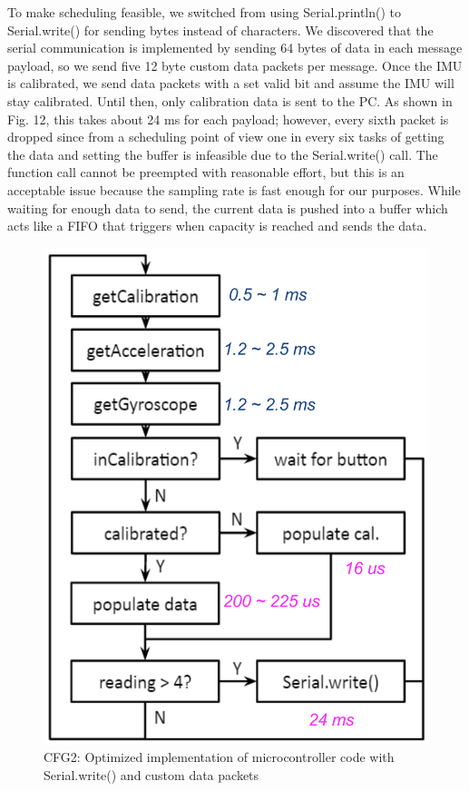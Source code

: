 \documentclass[10pt,journal]{IEEEtran}
\begin{document}
\par To make scheduling feasible, we switched from using Serial.println() to Serial.write() for sending bytes instead of characters. We discovered that the serial communication is implemented by sending 64 bytes of data in each message payload, so we send five 12 byte custom data packets per message. Once the IMU is calibrated, we send data packets with a set valid bit and assume the IMU will stay calibrated. Until then, only calibration data is sent to the PC. As shown in Fig. 12, this takes about 24 ms for each payload; however, every sixth packet is dropped since from a scheduling point of view one in every six tasks of getting the data and setting the buffer is infeasible due to the Serial.write() call. The function call cannot be preempted with reasonable effort, but this is an acceptable issue because the sampling rate is fast enough for our purposes. While waiting for enough data to send, the current data is pushed into a buffer which acts like a FIFO that triggers when capacity is reached and sends the data.
\begin{figure}[h]
  \centering
    \includegraphics[width=0.8\linewidth]{figures/cfg2}
  \caption{CFG2: Optimized implementation of microcontroller code with Serial.write() and custom data packets}
  \label{fig:cfg2}
\end{figure}
\end{document}
